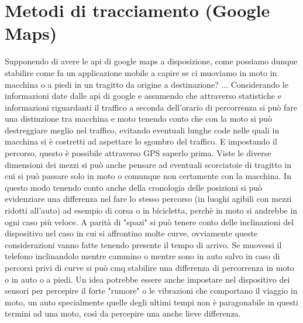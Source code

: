 \documentclass[]{scrartcl}
\begin{document}
\section{Metodi di tracciamento (Google Maps)}
Supponendo di avere le api di google maps a disposizione, come possiamo dunque stabilire come fa un applicazione mobile a capire se ci muoviamo in moto in macchina o a piedi in un tragitto da origine a destinazione? ... 
Considerando le informazioni date dalle api di google e assumendo che attraverso statistiche e informazioni riguardanti il traffico a seconda dell'orario di percorrenza si può fare una distinzione tra macchina e moto tenendo conto che con la moto si può destreggiare meglio nel traffico, evitando eventuali lunghe code nelle quali in macchina si è costretti ad aspettare lo sgombro del traffico. E impostando il percorso, questo è possibile attraverso GPS saperlo prima. Viste le diverse dimensioni dei mezzi si può anche pensare ad eventuali scorciatoie di tragitto in cui si può passare solo in moto o comunque non certamente con la macchina. In questo modo tenendo conto anche della cronologia delle posizioni si può evidenziare una differenza nel fare lo stesso percorso (in luoghi agibili con mezzi ridotti all'auto) ad esempio di corsa o in bicicletta, perchè in moto si andrebbe in ogni caso più veloce. A parità di "spazi" si può tenere conto delle inclinazioni del dispositivo nel caso in cui si affrontino molte curve, ovviamente queste considerazioni vanno fatte tenendo presente il tempo di arrivo. Se muovessi il telefono inclinandolo mentre cammino o mentre sono in auto salvo in caso di percorsi privi di curve si può cmq stabilire una differenza di percorrenza in moto o in auto o a piedi. Un idea potrebbe essere anche impostare nel dispositivo dei sensori per percepire il forte "rumore" o le vibrazioni che comportano il viaggio in moto, un auto specialmente quelle degli ultimi tempi non è paragonabile in questi termini ad una moto, così da percepire una anche lieve differenza.
\end{document}
